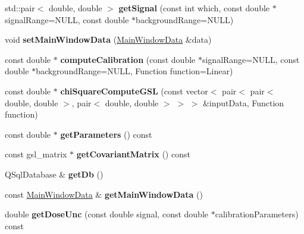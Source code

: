 \begin{DoxyCompactItemize}
\item 
\hypertarget{classDataHandle_a923935abbf57334773e277fe78960c19}{std\-::pair$<$ double, double $>$ {\bfseries get\-Signal} (const int which, const double $\ast$signal\-Range=N\-U\-L\-L, const double $\ast$background\-Range=N\-U\-L\-L)}\label{classDataHandle_a923935abbf57334773e277fe78960c19}

\item 
\hypertarget{classDataHandle_a969c18ae3f2bc8782ab02959a244e965}{void {\bfseries set\-Main\-Window\-Data} (\hyperlink{structMainWindowData}{Main\-Window\-Data} \&data)}\label{classDataHandle_a969c18ae3f2bc8782ab02959a244e965}

\item 
\hypertarget{classDataHandle_af005735776acdb074212d5c82224a306}{const double $\ast$ {\bfseries compute\-Calibration} (const double $\ast$signal\-Range=N\-U\-L\-L, const double $\ast$background\-Range=N\-U\-L\-L, Function function=Linear)}\label{classDataHandle_af005735776acdb074212d5c82224a306}

\item 
\hypertarget{classDataHandle_a8aebf9e31648489bed13d51ca965a91a}{const double $\ast$ {\bfseries chi\-Square\-Compute\-G\-S\-L} (const vector$<$ pair$<$ pair$<$ double, double $>$, pair$<$ double, double $>$ $>$ $>$ \&input\-Data, Function function)}\label{classDataHandle_a8aebf9e31648489bed13d51ca965a91a}

\item 
\hypertarget{classDataHandle_aeeedcdce39700e848e80bef4f3d70a69}{const double $\ast$ {\bfseries get\-Parameters} () const }\label{classDataHandle_aeeedcdce39700e848e80bef4f3d70a69}

\item 
\hypertarget{classDataHandle_ab020432837359dc871d483c329aa6f2b}{const gsl\-\_\-matrix $\ast$ {\bfseries get\-Covariant\-Matrix} () const }\label{classDataHandle_ab020432837359dc871d483c329aa6f2b}

\item 
\hypertarget{classDataHandle_ad27a12a6bd6bb3b72c4ea008599c7de1}{Q\-Sql\-Database \& {\bfseries get\-Db} ()}\label{classDataHandle_ad27a12a6bd6bb3b72c4ea008599c7de1}

\item 
\hypertarget{classDataHandle_a138330c0f643216df97c21ba9a66f39d}{const \hyperlink{structMainWindowData}{Main\-Window\-Data} \& {\bfseries get\-Main\-Window\-Data} ()}\label{classDataHandle_a138330c0f643216df97c21ba9a66f39d}

\item 
\hypertarget{classDataHandle_a43f94cde8228583790f7c279df9ef8e8}{double {\bfseries get\-Dose\-Unc} (const double signal, const double $\ast$calibration\-Parameters) const }\label{classDataHandle_a43f94cde8228583790f7c279df9ef8e8}


\end{DoxyCompactItemize}
